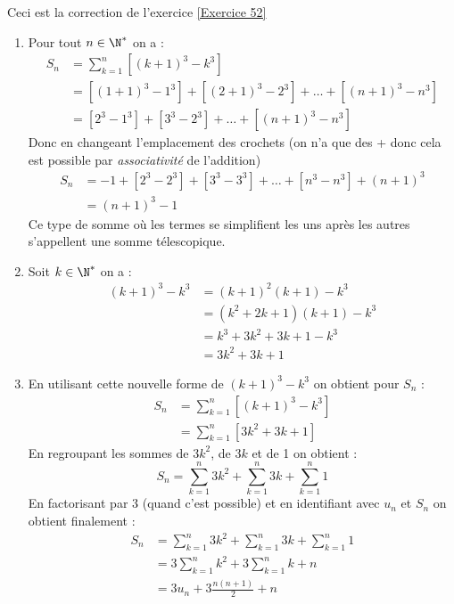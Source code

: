 \documentclass[12pt,fleqn]{report} %
\begin{document}
\begin{correction}
	Ceci est la correction de l'exercice \ref{Exercice 52}
	\begin{enumerate}
		\item Pour tout $n\in \N^*$ on a :
		\begin{align*}
		S_n & = \sum_{k = 1}^{n} \left[(k+1)^3 - k^3\right] \\
		& = \left[(1+1)^3 - 1^3\right] + \left[(2 + 1)^3 - 2^3\right] + \dots + \left[(n+1)^3 - n^3\right] \\
		& =  \left[2^3 - 1^3\right] + \left[3^3 - 2^3\right] + \dots + \left[(n+1)^3 - n^3\right]
		\end{align*}
		Donc en changeant l'emplacement des crochets (on n'a que des + donc cela est possible par \emph{associativité} de l'addition)
		\begin{align*}
		S_n & = - 1 + \left[2^3 - 2^3\right] + \left[3^3 - 3^3\right] + \dots + \left[n^3 - n^3\right] + (n+1)^3 \\
		& = (n+1)^3 - 1
		\end{align*}
		Ce type de somme où les termes se simplifient les uns après les autres s'appellent une somme télescopique.
		\item Soit $k \in \N^*$ on a :
		\begin{align*}
		(k+1)^3 - k^3 & = (k+1)^2(k+1) - k^3 \\
		& = (k^2 + 2k  + 1)(k+1) - k^3 \\
		& = k^3 + 3k^2 + 3k + 1 - k^3 \\
		& = 3 k^2 + 3k + 1
		\end{align*}
		\item En utilisant cette nouvelle forme de $(k+1)^3 - k^3$ on obtient pour $S_n$ :
		\begin{align*}
		S_n & =\sum_{k = 1}^{n} \left[(k+1)^3 - k^3\right] \\
		& = \sum_{k = 1}^n \left[3 k^2 + 3k + 1\right]
		\end{align*}
		En regroupant les sommes de $3k^2$, de $3k$ et de 1 on obtient :
		\[
		S_n = \sum_{k = 1}^n 3k^2 + \sum_{k = 1}^n 3k + \sum_{k = 1}^n 1 
		\]
		En factorisant par 3 (quand c'est possible) et en identifiant avec $u_n$ et $S_n$ on obtient finalement : 
		\begin{align*}
		S_n & = \sum_{k = 1}^n 3k^2 + \sum_{k = 1}^n 3k + \sum_{k = 1}^n 1  \\ 
		& = 3 \sum_{k = 1}^n k^2 + 3\sum_{k = 1}^n k + n \\
		& = 3 u_n + 3 \frac{n(n+1)}{2} + n
		\end{align*}

\end{enumerate}
\end{correction}
\end{document}
